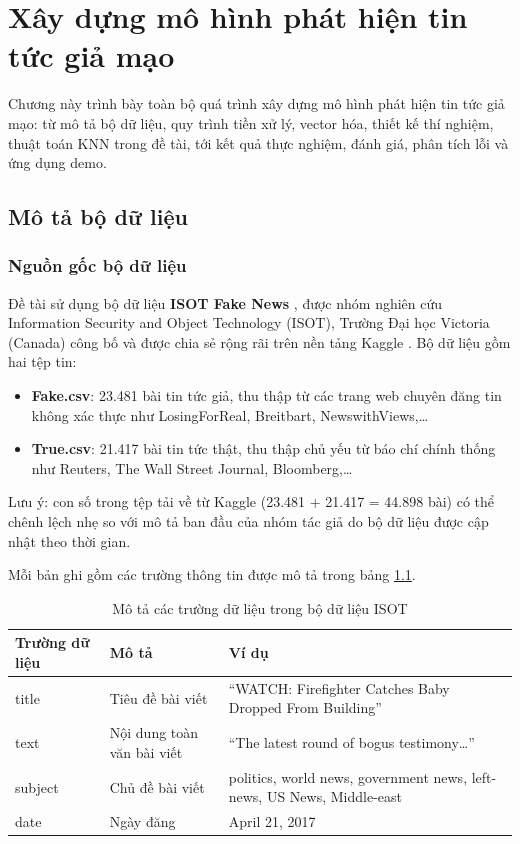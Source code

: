 \chapter[XÂY DỰNG MÔ HÌNH PHÁT HIỆN TIN TỨC GIẢ MẠO]{Xây dựng mô hình phát hiện tin tức giả mạo}

Chương này trình bày toàn bộ quá trình xây dựng mô hình phát hiện tin tức giả mạo: từ mô tả bộ dữ liệu, quy trình tiền xử lý, vector hóa, thiết kế thí nghiệm, thuật toán KNN trong đề tài, tới kết quả thực nghiệm, đánh giá, phân tích lỗi và ứng dụng demo.

\section{Mô tả bộ dữ liệu}

\subsection{Nguồn gốc bộ dữ liệu}

Đề tài sử dụng bộ dữ liệu \textbf{ISOT Fake News} \cite{ahmed2017}, được nhóm nghiên cứu Information Security and Object Technology (ISOT), Trường Đại học Victoria (Canada) công bố và được chia sẻ rộng rãi trên nền tảng Kaggle \cite{dataset}. Bộ dữ liệu gồm hai tệp tin:

\begin{itemize}
    \item \textbf{Fake.csv}: 23.481 bài tin tức giả, thu thập từ các trang web chuyên đăng tin không xác thực như LosingForReal, Breitbart, NewswithViews,\ldots
    \item \textbf{True.csv}: 21.417 bài tin tức thật, thu thập chủ yếu từ báo chí chính thống như Reuters, The Wall Street Journal, Bloomberg,\ldots
\end{itemize}

Lưu ý: con số trong tệp tải về từ Kaggle (23.481 + 21.417 = 44.898 bài) có thể chênh lệch nhẹ so với mô tả ban đầu của nhóm tác giả \cite{ahmed2017} do bộ dữ liệu được cập nhật theo thời gian.

Mỗi bản ghi gồm các trường thông tin được mô tả trong bảng \ref{tab:mo-ta-du-lieu}.

\begin{table}[H]
\centering
\caption{Mô tả các trường dữ liệu trong bộ dữ liệu ISOT}
\label{tab:mo-ta-du-lieu}
\begin{tabular}{|p{3cm}|p{5cm}|p{4.5cm}|}
\hline
\textbf{Trường dữ liệu} & \textbf{Mô tả} & \textbf{Ví dụ} \\
\hline
title & Tiêu đề bài viết & ``WATCH: Firefighter Catches Baby Dropped From Building'' \\
\hline
text & Nội dung toàn văn bài viết & ``The latest round of bogus testimony\ldots'' \\
\hline
subject & Chủ đề bài viết & politics, world news, government news, left-news, US News, Middle-east \\
\hline
date & Ngày đăng & April 21, 2017 \\
\hline
\end{tabular}
\end{table}

